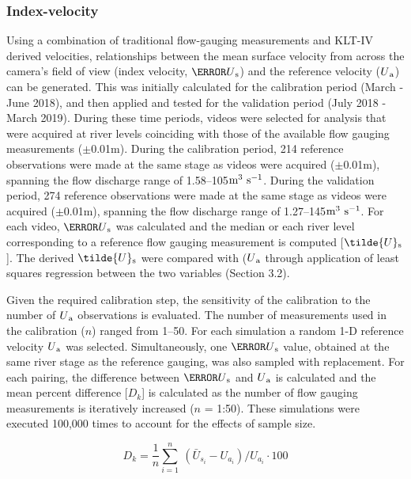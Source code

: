 \documentclass[hess, manuscript]{copernicus} %
\begin{document}
\subsubsection{Index-velocity} \label{Index-velocity}
Using a combination of traditional flow-gauging measurements and KLT-IV derived velocities, relationships between the mean surface velocity from across the camera's field of view (index velocity, $\bar{U}\textsubscript{s}$) and the reference velocity ($U\textsubscript{a}$) can be generated. This was initially calculated for the calibration period (March - June 2018), and then applied and tested for the validation period (July 2018 - March 2019). During these time periods, videos were selected for analysis that were acquired at river levels coinciding with those of the available flow gauging measurements ($\pm$0.01m). During the calibration period, 214 reference observations were made at the same stage as videos were acquired ($\pm$0.01m), spanning the flow discharge range of 1.58--105$\textnormal{m\textsuperscript{3} s\textsuperscript{-1}}$. During the validation period, 274 reference observations were made at the same stage as videos were acquired ($\pm$0.01m), spanning the flow discharge range of 1.27--145$\textnormal{m\textsuperscript{3} s\textsuperscript{-1}}$. For each video, $\bar{U}\textsubscript{s}$ was calculated and the median or each river level corresponding to a reference flow gauging measurement is computed [$\tilde{U}\textsubscript{s}$]. The derived $\tilde{U}\textsubscript{s}$ were compared with ($U\textsubscript{a}$ through application of least squares regression between the two variables (Section 3.2).

Given the required calibration step, the sensitivity of the calibration to the number of $U\textsubscript{a}$ observations is evaluated. The number of measurements used in the calibration ($n$) ranged from 1--50. For each simulation a random 1-D reference velocity $U\textsubscript{a}$ was selected. Simultaneously, one $\bar{U}\textsubscript{s}$ value, obtained at the same river stage as the reference gauging, was also sampled with replacement. For each pairing, the difference between $\bar{U}\textsubscript{s}$ and $U\textsubscript{a}$ is calculated and the mean percent difference [${D_k}$] is calculated as the number of flow gauging measurements is iteratively increased ($n$ = 1:50). These simulations were executed 100,000 times to account for the effects of sample size.

\begin{equation}
{D_k} = \frac{1}{n} \sum_{i=1}^{n} \ (\bar{U}_{s_i} - U_{a_i}) / U_{a_i}  \cdot 100
\label{eqn: Equation 5}
\end{equation}
\end{document}

